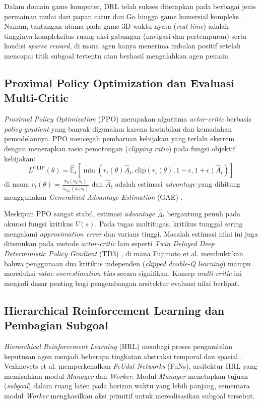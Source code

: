 \documentclass[conference]{IEEEtran}
\begin{document}
Dalam domain game komputer, DRL telah sukses diterapkan pada berbagai jenis permainan mulai dari papan catur dan Go hingga game komersial kompleks \cite{yannakakis2018artificial}. Namun, tantangan utama pada game 3D waktu nyata (\textit{real-time}) adalah tingginya kompleksitas ruang aksi gabungan (navigasi dan pertempuran) serta kondisi \textit{sparse reward}, di mana agen hanya menerima imbalan positif setelah mencapai titik subgoal tertentu atau berhasil mengalahkan agen pemain.

\subsection{Proximal Policy Optimization dan Evaluasi Multi-Critic}
\textit{Proximal Policy Optimization} (PPO) \cite{schulman2017proximal} merupakan algoritma \textit{actor-critic} berbasis \textit{policy gradient} yang banyak digunakan karena kestabilan dan kemudahan pemodelannya. PPO mencegah pembaruan kebijakan yang terlalu ekstrem dengan menerapkan rasio pemotongan (\textit{clipping ratio}) pada fungsi objektif kebijakan:
\begin{equation}
L^{\text{CLIP}}(\theta) = \hat{\mathbb{E}}_t \left[ \min(r_t(\theta)\hat{A}_t, \text{clip}(r_t(\theta), 1-\epsilon, 1+\epsilon)\hat{A}_t) \right]
\end{equation}
di mana \(r_t(\theta) = \frac{\pi_\theta(a_t|s_t)}{\pi_{\theta_{\text{old}}}(a_t|s_t)}\) dan \(\hat{A}_t\) adalah estimasi \textit{advantage} yang dihitung menggunakan \textit{Generalized Advantage Estimation} (GAE) \cite{schulman2015high}.

Meskipun PPO sangat stabil, estimasi \textit{advantage} \(\hat{A}_t\) bergantung penuh pada akurasi fungsi kritikus \(V(s)\). Pada tugas multitugas, kritikus tunggal sering mengalami \textit{approximation error} dan varians tinggi. Masalah estimasi nilai ini juga ditemukan pada metode \textit{actor-critic} lain seperti \textit{Twin Delayed Deep Deterministic Policy Gradient} (TD3) \cite{fujimoto2018addressing}, di mana Fujimoto et al. membuktikan bahwa penggunaan dua kritikus independen (\textit{clipped double-Q learning}) mampu mereduksi \textit{value overestimation bias} secara signifikan. Konsep \textit{multi-critic} ini menjadi dasar penting bagi pengembangan arsitektur evaluasi nilai berlipat.

\subsection{Hierarchical Reinforcement Learning dan Pembagian Subgoal}
\textit{Hierarchical Reinforcement Learning} (HRL) membagi proses pengambilan keputusan agen menjadi beberapa tingkatan abstraksi temporal dan spasial \cite{sutton2018reinforcement}. Vezhnevets et al. \cite{vezhnevets2017feudal} memperkenalkan \textit{FeUdal Networks} (FuNs), arsitektur HRL yang memisahkan modul \textit{Manager} dan \textit{Worker}. Modul \textit{Manager} menetapkan tujuan (\textit{subgoal}) dalam ruang laten pada horizon waktu yang lebih panjang, sementara modul \textit{Worker} menghasilkan aksi primitif untuk merealisasikan subgoal tersebut.
\end{document}
